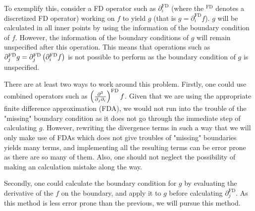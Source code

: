 To exemplify this, consider a FD operator such as $\partial^{\text{FD}}_i$
(where the $^\text{FD}$ denotes a discretized FD operator) working on $f$ to
yield $g$ (that is $g = \partial^{\text{FD}}_if$). $g$ will be calculated in
all inner points by using the information of the boundary condition of $f$.
However, the information of the boundary conditions of $g$ will remain
unspecified after this operation.  This means that operations such as
$\partial^{\text{FD}}_j g = \partial_j^{\text{FD}}\left(\partial_i^{\text{FD}}
f\right)$ is not possible to perform as the boundary condition of $g$ is
unspecified.

There are at least two ways to work around this problem. Firstly, one could use
combined operators such as $\left(\frac{\partial {^2}}{\partial{_j\partial_i}}\right)^\text{FD}f$.  Given
that we are using the appropriate finite difference approximation (FDA), we
would not run into the trouble of the "missing" boundary condition as it does
not go through the immediate step of calculating $g$.  However, rewriting the
divergence terms in such a way that we will only make use of FDAs which does
not give troubles of "missing" boundaries yields many terms, and implementing
all the resulting terms can be error prone as there are so many of them. Also,
one should not neglect the possibility of making an calculation mistake along
the way.

Secondly, one could calculate the boundary condition for $g$ by evaluating the
derivative of the $f$ on the boundary, and apply it to $g$ before calculating
$\partial^{\text{FD}}_j$. As this method is less error prone than the previous,
we will pursue this method.

